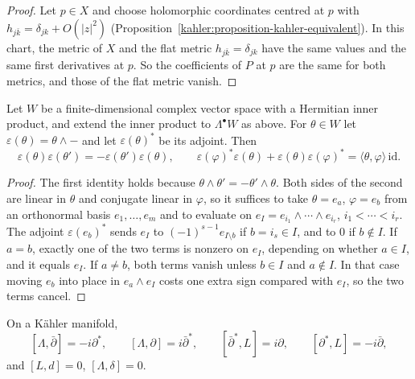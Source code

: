 \begin{proof}
Let $p \in X$ and choose holomorphic coordinates centred at $p$ with $h_{j\bar k} = \delta_{jk} + O(|z|^2)$
(Proposition~\ref{kahler:proposition-kahler-equivalent}). In this chart, the metric of $X$ and the flat metric $h_{j\bar k} = \delta_{jk}$ have
the same values and the same first derivatives at $p$. So the coefficients of $P$ at $p$ are the same for both metrics, and those of
the flat metric vanish.
\end{proof}

\begin{lemma}\label{kahler:lemma-car}
Let $W$ be a finite-dimensional complex vector space with a Hermitian inner product, and extend the inner product to $\Lambda^\bullet W$
as above. For $\theta \in W$ let $\varepsilon(\theta) = \theta \wedge -$ and let $\varepsilon(\theta)^*$ be its adjoint. Then
\[
\varepsilon(\theta)\varepsilon(\theta') = -\varepsilon(\theta')\varepsilon(\theta), \qquad
\varepsilon(\varphi)^*\varepsilon(\theta) + \varepsilon(\theta)\varepsilon(\varphi)^* = \langle\theta, \varphi\rangle\,\mathrm{id}.
\]
\end{lemma}

\begin{proof}
The first identity holds because $\theta \wedge \theta' = -\theta' \wedge \theta$. Both sides of the second are linear in $\theta$ and
conjugate linear in $\varphi$, so it suffices to take $\theta = e_a$, $\varphi = e_b$ from an orthonormal basis $e_1, \ldots, e_m$ and to
evaluate on $e_I = e_{i_1} \wedge \cdots \wedge e_{i_r}$, $i_1 < \cdots < i_r$. The adjoint $\varepsilon(e_b)^*$ sends $e_I$ to
$(-1)^{s-1}e_{I \setminus b}$ if $b = i_s \in I$, and to $0$ if $b \notin I$. If $a = b$, exactly one of the two terms is nonzero on
$e_I$, depending on whether $a \in I$, and it equals $e_I$. If $a \neq b$, both terms vanish unless $b \in I$ and $a \notin I$. In that case
moving $e_b$ into place in $e_a \wedge e_I$ costs one extra sign compared with $e_I$, so the two terms cancel.
\end{proof}

\begin{theorem}\label{kahler:theorem-kahler-identities}
On a K\"ahler manifold,
\[
[\Lambda, \bar\partial] = -i\partial^*, \qquad [\Lambda, \partial] = i\bar\partial^*, \qquad [\bar\partial^*, L] = i\partial, \qquad [\partial^*, L] = -i\bar\partial,
\]
and $[L, d] = 0$, $[\Lambda, \delta] = 0$.
\end{theorem}

